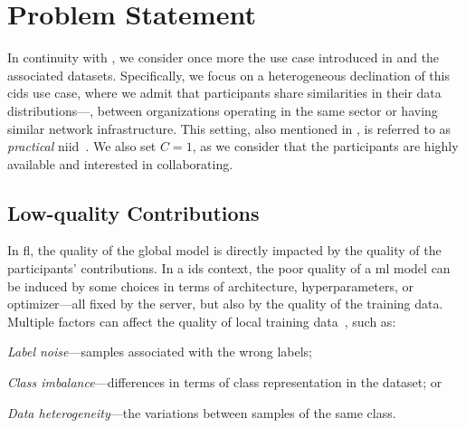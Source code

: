 \section{Problem Statement\label{sec:radar.problem}}

In continuity with , we consider once more the use case introduced in  and the associated datasets.
Specifically, we focus on a heterogeneous declination of this \gls{cids} use case, where we admit that participants share similarities in their data distributions---\eg, between organizations operating in the same sector or having similar network infrastructure.
This setting, also mentioned in , is referred to as \emph{practical} \gls{niid}~\cite{huang_PersonalizedCrossSiloFederated_2021}.
We also set $C=1$, as we consider that the participants are highly available and interested in collaborating.

\subsection{Low-quality Contributions\label{sec:radar.problem.quality}}

In \gls{fl}, the quality of the global model is directly impacted by the quality of the participants' contributions.
In a \gls{ids} context, the poor quality of a \gls{ml} model can be induced by some choices in terms of architecture, hyperparameters, or optimizer---all fixed by the server, but also by the quality of the training data.
Multiple factors can affect the quality of local training data~\cite{jain_OverviewImportanceData_2020}, such as: 
\begin{enumerate*}[(1)]
  \item \emph{Label noise}---samples associated with the wrong labels;
  \item \emph{Class imbalance}---differences in terms of class representation in the dataset; or
  \item \emph{Data heterogeneity}---the variations between samples of the same class.
\end{enumerate*}

